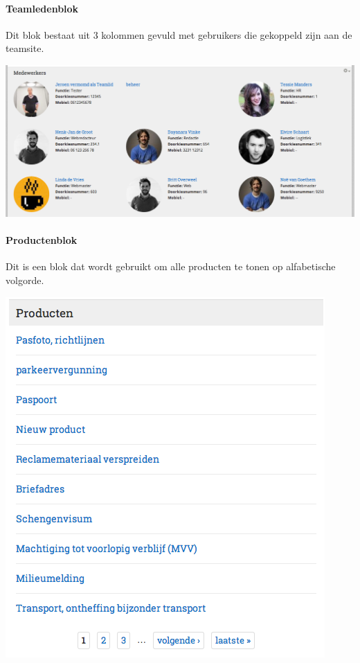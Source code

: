 \paragraph{Teamledenblok}

Dit blok bestaat uit 3 kolommen gevuld met gebruikers die gekoppeld zijn aan de teamsite.

\begin{center}
	\includegraphics[width=\textwidth]{img/blokken/personenintranet.png}
\end{center}

\paragraph{Productenblok}

Dit is een blok dat wordt gebruikt om alle producten te tonen op alfabetische volgorde.

\begin{center}
	\includegraphics[scale=0.5]{img/blokken/producten.png}
\end{center}

